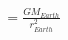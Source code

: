 \documentclass[preview]{standalone}
\begin{document}
\begin{align*}
= \frac{GM_{Earth}}{r_{Earth}^2}
\end{align*}
\end{document}
